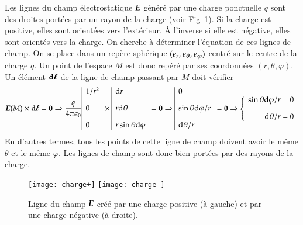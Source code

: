 \begin{exemple}
	Les lignes du champ électrostatique $\vece$ généré par une charge ponctuelle $q$
	sont des droites portées par un rayon de la charge (voir Fig~\ref{fig:lignes}). 
	Si la charge est positive, elles sont orientées vers l'extérieur. À
	l'inverse si elle
	est négative, elles sont orientés vers la charge. On cherche à déterminer l'équation
	de ces lignes de champ. On se place dans un repère sphérique $(\er, \etheta, \ephi)$
	centré sur le centre de la charge $q$. Un point de l'espace $M$ est donc repéré par
	ses coordonnées $(r, \theta, \varphi)$. Un élément $\dl$ de la ligne de champ 
	passant par $M$ doit vérifier
	\begin{equation*}
		\vece(M) \times \dl = \mitbf{0} \Rightarrow
		\dfrac{q}{4 \pi \epsilon_0}
		\begin{array}{|l}
			1/r^2 \\[1em]
			0 \\[1em]
		0 \\
		\end{array}
		\times
		\begin{array}{|l}
			\dr \\[1em] 
			r \dtheta \\[1em]
			r \sin \theta \dphi \\
		\end{array}
		= \mitbf{0}
		\Rightarrow
		\begin{array}{|l}
			0 \\[1em] 
			\sin \theta \dphi/r \\[1em]
			\dtheta/r \\
		\end{array}
		= \mitbf{0}
		\Rightarrow
		\left\{
		\begin{array}{rcl}
			\sin \theta \dphi/r = 0 \\[1em]
			\dtheta/r = 0 \\
		\end{array}
		\right.
	\end{equation*}
En d'autres termes, tous les points de cette ligne de champ doivent avoir le 
même $\theta$ et le même $\varphi$. Les lignes de champ sont donc bien portées 
par des rayons de la charge.
\end{exemple}

\begin{figure}[h!]
	\centering
	\texttt{[image: charge+]}
	\texttt{[image: charge-]}
	\caption{Ligne du champ $\vece$ créé par une charge positive (à gauche)
	         et par une charge négative (à droite).}%
	\label{fig:lignes}
\end{figure}

